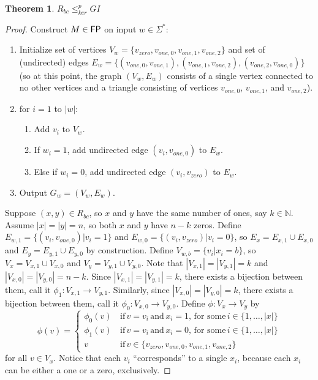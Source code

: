 \documentclass{article}
\newtheorem{theorem}{Theorem}[section]
\theoremstyle{definition}
\newcommand{\plain}[1]{\,\text{#1}\,} %
\newcommand{\sigmastar}{\Sigma^{*}}
\newcommand{\kr}{\leq^{p}_{ker}} %
\begin{document}
\begin{theorem}\label{thm:rbc-gi}$R_{bc}\kr GI$\end{theorem}
\begin{proof}
  Construct $M\in {\ensuremath{\mathsf{FP}}}$ on input $w \in \sigmastar$:
  \begin{enumerate}
  \item Initialize set of vertices $V_w=\{v_{zero}, v_{one,0}, v_{one,1},
    v_{one,2}\}$ and set of (undirected) edges $E_w=\{(v_{one,0}, v_{one,1}),
    (v_{one,1}, v_{one,2}), (v_{one,2}, v_{one,0})\}$ (so at this point, the
    graph $(V_w, E_w)$ consists of a single vertex connected to no other
    vertices and a triangle consisting of vertices $v_{one,0}$, $v_{one,1}$,
    and $v_{one,2}$).
  \item for $i=1$ to $|w|$:
    \begin{enumerate}
    \item Add $v_i$ to $V_w$.
    \item If $w_i = 1$, add undirected edge $(v_i, v_{one,0})$ to $E_w$.
    \item Else if $w_i = 0$, add undirected edge $(v_i, v_{zero})$ to $E_w$.
    \end{enumerate}
  \item Output $G_w=(V_w, E_w)$.
  \end{enumerate}
  
  Suppose $(x, y)\in R_{bc}$, so $x$ and $y$ have the same number of ones, say
  $k\in\mathbb{N}$. Assume $|x|=|y|=n$, so both $x$ and $y$ have $n-k$
  zeros. Define $E_{w,1}=\{(v_i, v_{one,0})|v_i = 1\}$ and $E_{w,0}=\{(v_i,
  v_{zero})|v_i = 0\}$, so $E_x = E_{x,1}\cup E_{x,0}$ and $E_y = E_{y,1} \cup
  E_{y,0}$ by construction. Define $V_{w,b}=\{v_i|x_i=b\}$, so $V_x=V_{x,1}
  \cup V_{x,0}$ and $V_y=V_{y,1} \cup V_{y,0}$. Note that
  $|V_{x,1}|=|V_{y,1}|=k$ and $|V_{x,0}|=|V_{y,0}|=n-k$. Since
  $|V_{x,1}|=|V_{y,1}|=k$, there exists a bijection between them, call it
  $\phi_1:V_{x,1}\to V_{y,1}$. Similarly, since $|V_{x,0}|=|V_{y,0}|=k$, there
  exists a bijection between them, call it $\phi_0:V_{x,0}\to V_{y,0}$. Define
  $\phi:V_x\to V_y$ by 
  \begin{displaymath}
    \phi(v) = 
    \begin{cases}
      \phi_0(v) & \plain{if} v = v_i \plain{and} x_i = 1, \plain{for some} i\in\{1,\ldots,|x|\}\\
      \phi_1(v) & \plain{if} v = v_i \plain{and} x_i = 0, \plain{for some} i\in\{1,\ldots,|x|\}\\
      v & \plain{if} v \in \{v_{zero}, v_{one,0}, v_{one,1}, v_{one,2}\}
    \end{cases}
  \end{displaymath}
  for all $v\in V_x$. Notice that each $v_i$ ``corresponds'' to a
  single $x_i$, because each $x_i$ can be either a one or a zero,
  exclusively.


\end{proof}
\end{document}
